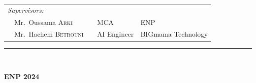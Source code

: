 {\begin{titlepage}
\begin{flushleft}
\begin{tabular}{llcll}
            \\
            \textit{Supervisors:}                                  &  &             &                    \\
            \multicolumn{2}{l}{~~Mr.\ Oussama \textsc{Arki}}       &  & MCA         & ENP                \\
            \multicolumn{2}{l}{~~Mr.\ Hachem \textsc{Betrouni}}    &  & AI Engineer & BIGmama Technology \\
        \end{tabular}
    \end{flushleft}

    \vspace*{12mm}

    \rule{\linewidth}{1pt} \\[5mm]
    \begin{center}
        \textbf{ENP 2024}
    \end{center}

\end{titlepage}
}